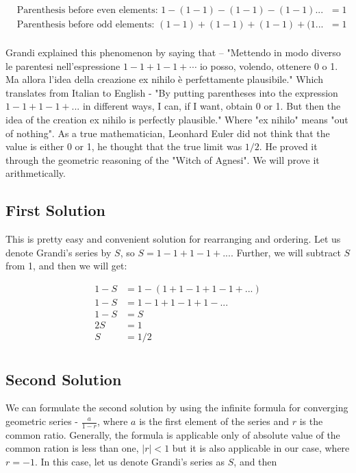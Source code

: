 \documentclass{beamer}
\begin{document}
\begin{align*}
&\text{Parenthesis before even elements: } 1-(1-1)-(1-1)-(1-1)...&=1\\
&\text{Parenthesis before odd elements: } (1-1)+(1-1)+(1-1)+(1...&=1\\
\end{align*}

Grandi explained this phenomenon by saying that – "Mettendo in modo diverso le parentesi
nell'espressione $1-1+1-1+\cdots$ io posso, volendo, ottenere 0 o 1. Ma allora l'idea della creazione ex
nihilo è perfettamente plausibile."\cite{Mettendo} Which translates from Italian to English - "By putting parentheses into the expression
$1-1+1-1+...$ in different ways, I can, if I want, obtain 0 or 1. But then the idea of the creation
ex nihilo is perfectly plausible." Where "ex nihilo" means "out of nothing".\cite{Exnihilo}
As a true mathematician, Leonhard Euler did not think that the value is either 0 or 1, he thought that the true limit was $1/2$.
He proved it through the geometric reasoning of the "Witch of Agnesi". We will prove it arithmetically.

\subsection{First Solution}

This is pretty easy and convenient solution for rearranging and ordering. Let us denote Grandi’s
series by $S$, so $S=1-1+1-1+...$. Further, we will subtract $S$ from 1, and then we will get:

\begin{align*}
  1-S&=1-(1+1-1+1-1+...)\\
  1-S&=1-1+1-1+1-...\\
  1-S&=S\\
  2S&=1\\
  S&=1/2\\
  \end{align*}

\subsection{Second Solution}

We can formulate the second solution by using the infinite formula for converging geometric
series - $\frac{a}{1-r}$, where $a$ is the first element of the series and $r$ is the common ratio.
Generally, the formula is applicable only of absolute value of the common ration is less than one, $|r| < 1$ but
it is also applicable in our case, where $r = - 1$. In this case, let us denote Grandi's series as $S$, and
then
\end{document}
